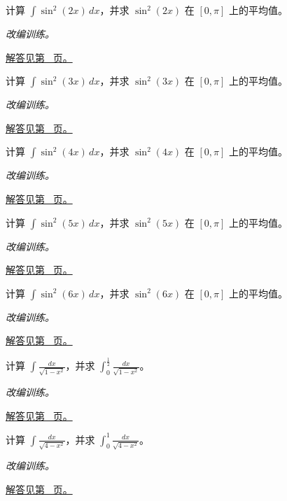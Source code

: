 \documentclass[12pt,fontset=fandol]{ctexart}
\begin{document}
\begin{example}[降幂公式与平均值]\label{ex:c14q8}
计算 $\displaystyle\int\sin^2(2x)\,dx$，并求 $\sin^2(2x)$ 在 $[0,\pi]$ 上的平均值。
\par\textit{改编训练。}\par\hyperref[ans:c14q8]{解答见第~\pageref{ans:c14q8} 页。}
\end{example}
\begin{example}[降幂公式与平均值]\label{ex:c14q9}
计算 $\displaystyle\int\sin^2(3x)\,dx$，并求 $\sin^2(3x)$ 在 $[0,\pi]$ 上的平均值。
\par\textit{改编训练。}\par\hyperref[ans:c14q9]{解答见第~\pageref{ans:c14q9} 页。}
\end{example}
\begin{example}[降幂公式与平均值]\label{ex:c14q10}
计算 $\displaystyle\int\sin^2(4x)\,dx$，并求 $\sin^2(4x)$ 在 $[0,\pi]$ 上的平均值。
\par\textit{改编训练。}\par\hyperref[ans:c14q10]{解答见第~\pageref{ans:c14q10} 页。}
\end{example}
\begin{example}[降幂公式与平均值]\label{ex:c14q11}
计算 $\displaystyle\int\sin^2(5x)\,dx$，并求 $\sin^2(5x)$ 在 $[0,\pi]$ 上的平均值。
\par\textit{改编训练。}\par\hyperref[ans:c14q11]{解答见第~\pageref{ans:c14q11} 页。}
\end{example}
\begin{example}[降幂公式与平均值]\label{ex:c14q12}
计算 $\displaystyle\int\sin^2(6x)\,dx$，并求 $\sin^2(6x)$ 在 $[0,\pi]$ 上的平均值。
\par\textit{改编训练。}\par\hyperref[ans:c14q12]{解答见第~\pageref{ans:c14q12} 页。}
\end{example}
\begin{example}[圆根式与三角换元]\label{ex:c14q13}
计算 $\displaystyle\int\frac{dx}{\sqrt{1-x^2}}$，并求 $\displaystyle\int_0^{\frac{1}{2}}\frac{dx}{\sqrt{1-x^2}}$。
\par\textit{改编训练。}\par\hyperref[ans:c14q13]{解答见第~\pageref{ans:c14q13} 页。}
\end{example}
\begin{example}[圆根式与三角换元]\label{ex:c14q14}
计算 $\displaystyle\int\frac{dx}{\sqrt{4-x^2}}$，并求 $\displaystyle\int_0^{1}\frac{dx}{\sqrt{4-x^2}}$。
\par\textit{改编训练。}\par\hyperref[ans:c14q14]{解答见第~\pageref{ans:c14q14} 页。}
\end{example}
\end{document}
